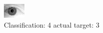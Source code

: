\begin{figure}[h!]
\begin{center}
\includegraphics[width=0.60\columnwidth]{figures/ID2066_class_4_target_3.png}
\end{center}
\caption{ Classification: 4 actual target: 3}
\label{fig:ID2066_class_4_target_3}
\end{figure}
